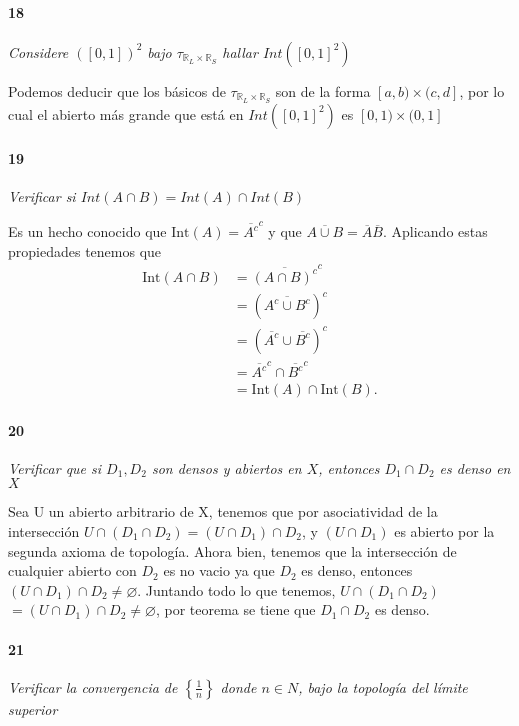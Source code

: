\documentclass[12pt]{article}
\begin{document}
\paragraph{18}
\textit{Considere $([0,1])^2$ bajo $\tau_{\mathbb{R}_L\times\mathbb{R}_S}$ hallar $Int([0,1]^2)$}

Podemos deducir que los b\'asicos de $\tau_{\mathbb{R}_L\times\mathbb{R}_S}$
son de la forma $[a, b) \times (c, d]$, por lo cual el abierto m\'as
grande que est\'a en $Int([0,1]^2)$ es $[0, 1) \times (0, 1]$

\paragraph{19}
\textit{Verificar si $Int(A\cap B)=Int(A)\cap Int(B)$}

Es un hecho conocido que $\text{Int}(A)=\overline{A^c}^c$ y que $\overline{A \cup B}=\overline{A} \overline{B}$. Aplicando estas propiedades tenemos que 
\begin{align*}
    \text{Int}(A \cap B) &=\overline{(A \cap B)^c}^c \\
                         &=(\overline{A^c \cup B^c})^c \\
                         &=(\overline{A^c} \cup \overline{B^c})^c \\
                         &=\overline{A^c}^c \cap \overline{B^c}^c \\
                         &=\text{Int}(A) \cap \text{Int}(B).
\end{align*}


\paragraph{20}
\textit{Verificar que si $D_{1}, D_{2}$ son densos y abiertos en $X$, entonces $D_{1} \cap D_{2}$ es denso en $X$}

Sea U un abierto arbitrario de X, tenemos que por
asociatividad de la intersecci\'on
$U \cap (D_{1} \cap D_{2}) = (U \cap D_{1}) \cap D_{2}$,
y $(U \cap D_{1})$ es abierto por la segunda axioma de
topolog\'ia. Ahora bien, tenemos que la intersecci\'on de
cualquier abierto con $D_{2}$ es no vacio ya que $D_{2}$ es
denso, entonces $(U \cap D_{1}) \cap D_{2} \neq \varnothing$.
Juntando todo lo que tenemos, $U \cap (D_{1} \cap D_{2})$
$= (U \cap D_{1}) \cap D_{2} \neq \varnothing$, por teorema
se tiene que $D_{1} \cap D_{2}$ es denso.

\paragraph{21}
\textit{Verificar la convergencia de $\left\{\frac{1}{n}\right\}$ donde $n \in N $, bajo la topolog\'ia del l\'imite superior }
\end{document}
